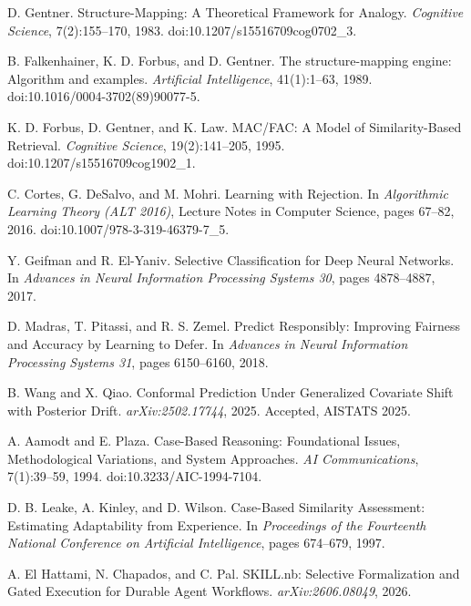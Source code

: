 D. Gentner. Structure-Mapping: A Theoretical Framework for Analogy. \emph{Cognitive Science}, 7(2):155--170, 1983. doi:10.1207/s15516709cog0702\_3.

B. Falkenhainer, K. D. Forbus, and D. Gentner. The structure-mapping engine: Algorithm and examples. \emph{Artificial Intelligence}, 41(1):1--63, 1989. doi:10.1016/0004-3702(89)90077-5.

K. D. Forbus, D. Gentner, and K. Law. MAC/FAC: A Model of Similarity-Based Retrieval. \emph{Cognitive Science}, 19(2):141--205, 1995. doi:10.1207/s15516709cog1902\_1.


C. Cortes, G. DeSalvo, and M. Mohri. Learning with Rejection. In \emph{Algorithmic Learning Theory (ALT 2016)}, Lecture Notes in Computer Science, pages 67--82, 2016. doi:10.1007/978-3-319-46379-7\_5.

Y. Geifman and R. El-Yaniv. Selective Classification for Deep Neural Networks. In \emph{Advances in Neural Information Processing Systems 30}, pages 4878--4887, 2017.

D. Madras, T. Pitassi, and R. S. Zemel. Predict Responsibly: Improving Fairness and Accuracy by Learning to Defer. In \emph{Advances in Neural Information Processing Systems 31}, pages 6150--6160, 2018.

B. Wang and X. Qiao. Conformal Prediction Under Generalized Covariate Shift with Posterior Drift. \emph{arXiv:2502.17744}, 2025. Accepted, AISTATS 2025.


A. Aamodt and E. Plaza. Case-Based Reasoning: Foundational Issues, Methodological Variations, and System Approaches. \emph{AI Communications}, 7(1):39--59, 1994. doi:10.3233/AIC-1994-7104.

D. B. Leake, A. Kinley, and D. Wilson. Case-Based Similarity Assessment: Estimating Adaptability from Experience. In \emph{Proceedings of the Fourteenth National Conference on Artificial Intelligence}, pages 674--679, 1997.


A. El Hattami, N. Chapados, and C. Pal. SKILL.nb: Selective Formalization and Gated Execution for Durable Agent Workflows. \emph{arXiv:2606.08049}, 2026.

